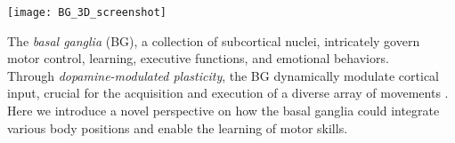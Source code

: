 \documentclass[portrait,final,a0paper,fontscale=0.36]{baposter}
\begin{document}
\begin{poster}
{	
	\begin{adjustbox}{minipage=0.95\textwidth, margin=5pt, center}
		\begin{minipage}[l]{0.35\textwidth}
			\centering
			\texttt{[image: BG\_3D\_screenshot]}
		\end{minipage}
		\begin{minipage}[l]{0.65\textwidth}
			\justifying
			The \textit{basal ganglia} (BG), a collection of subcortical nuclei, intricately govern motor control, learning, executive functions, and emotional behaviors. \\ 
			Through \textit{dopamine-modulated plasticity}, the BG dynamically modulate cortical input, crucial for the acquisition and execution of a diverse array of movements \parencite{parkBasalGangliaCircuits2020, dudmanBasalGangliaMotor2016}.\\ 
			Here we introduce a novel perspective on how the basal ganglia could integrate various body positions and enable the learning of motor skills.
		\end{minipage}
	\end{adjustbox}
}



\end{poster}
\end{document}

